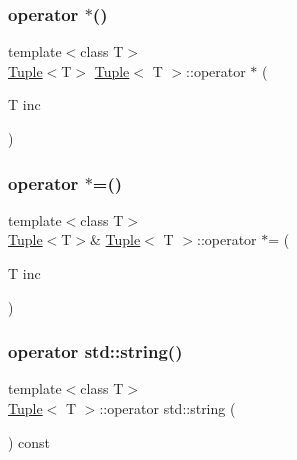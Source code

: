 \mbox{\label{class_tuple_ab5bd095731feb7aa39bcf41778eb144f}} 
\subsubsection{\texorpdfstring{operator $\ast$()}{operator *()}}
{\footnotesize\ttfamily template$<$class T$>$ \\
\mbox{\hyperlink{class_tuple}{Tuple}}$<$T$>$ \mbox{\hyperlink{class_tuple}{Tuple}}$<$ T $>$\+::operator $\ast$ (\begin{DoxyParamCaption}\item[{T}]{inc }\end{DoxyParamCaption})\hspace{0.3cm}{\ttfamily [inline]}}

\mbox{\label{class_tuple_a5dfd14ef6f956b608d6a99bdf0cf9c75}} 
\subsubsection{\texorpdfstring{operator $\ast$=()}{operator *=()}}
{\footnotesize\ttfamily template$<$class T$>$ \\
\mbox{\hyperlink{class_tuple}{Tuple}}$<$T$>$\& \mbox{\hyperlink{class_tuple}{Tuple}}$<$ T $>$\+::operator $\ast$= (\begin{DoxyParamCaption}\item[{T}]{inc }\end{DoxyParamCaption})\hspace{0.3cm}{\ttfamily [inline]}}

\mbox{\label{class_tuple_a9a4516890830c7a8bf96c9325718c8c3}} 
\subsubsection{\texorpdfstring{operator std::string()}{operator std::string()}}
{\footnotesize\ttfamily template$<$class T$>$ \\
\mbox{\hyperlink{class_tuple}{Tuple}}$<$ T $>$\+::operator std\+::string (\begin{DoxyParamCaption}{ }\end{DoxyParamCaption}) const\hspace{0.3cm}{\ttfamily [inline]}}

